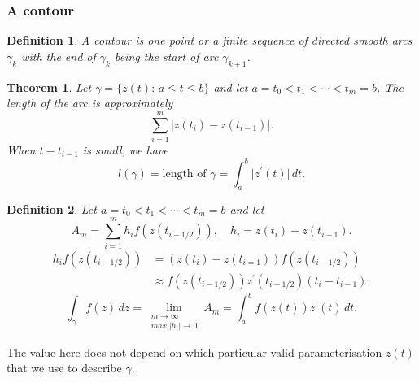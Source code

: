 \documentclass{article}
\newtheorem{theorem}{Theorem}
\newtheorem{definition}{Definition}
\begin{document}
\subsubsection{A contour}
\begin{definition}
    A contour is one point or a finite sequence of directed smooth arcs $\gamma_k$ with the end of $\gamma_k$ being the start of arc $\gamma_{k+1}$.
\end{definition}
\begin{theorem}
    Let $\gamma = \{ z(t):\, a\leq t\leq b \}$ and let $a=t_0<t_1<\cdots<t_m=b$. The length of the arc is approximately
    \begin{equation}
        \sum_{i=1}^m \vert z(t_i)-z(t_{i-1})\vert.
    \end{equation}
    When $t-t_{i-1}$ is small, we have
    \begin{equation}
        l(\gamma) = \text{length of }\gamma = \int_a^b \vert z^\prime (t)\vert\,dt.
    \end{equation}
\end{theorem}
\begin{definition}
    Let $a = t_0<t_1<\cdots<t_m=b$ and let
    \begin{equation}
        A_m = \sum_{i=1}^m h_i f(z(t_{i-1/2})),\quad h_i = z(t_i)-z(t_{i-1}). \nonumber
    \end{equation}
    \begin{align}
        h_i f(z(t_{i-1/2})) &= (z(t_i)-z(t_{i=1}))f(z(t_{i-1/2})) \nonumber \\
        &\approx f(z(t_{i-1/2}))z^\prime(t_{i-1/2})(t_i-t_{i-1}). \nonumber
    \end{align}
    \begin{equation}
        \int_\gamma f(z)\,dz = \lim_{\substack{m\to\infty \\ max_i\vert h_i\vert\to 0}}A_m = \int_a^b f(z(t))z^\prime(t)\,dt.
    \end{equation}
\end{definition}
The value here does not depend on which particular valid parameterisation $z(t)$ that we use to describe $\gamma$.
\end{document}
